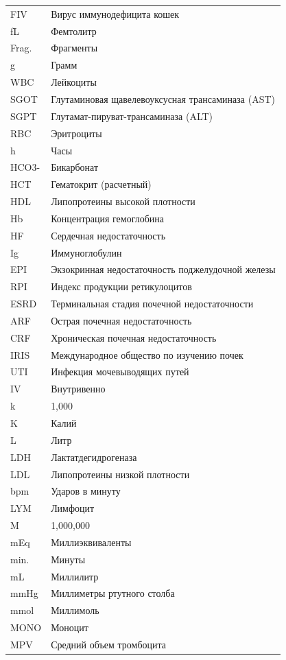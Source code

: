 \documentclass[a4paper,12pt]{book}
\begin{document}
\begin{longtable}{p{4cm} p{10cm}}
FIV & Вирус иммунодефицита кошек \\
fL & Фемтолитр \\
Frag. & Фрагменты \\
g & Грамм \\
WBC & Лейкоциты \\
SGOT & Глутаминовая щавелевоуксусная трансаминаза (AST) \\
SGPT & Глутамат-пируват-трансаминаза (ALT) \\
RBC & Эритроциты \\
h & Часы \\
HCO3- & Бикарбонат \\
HCT & Гематокрит (расчетный) \\
HDL & Липопротеины высокой плотности \\
Hb & Концентрация гемоглобина \\
HF & Сердечная недостаточность \\
Ig & Иммуноглобулин \\
EPI & Экзокринная недостаточность поджелудочной железы \\
RPI & Индекс продукции ретикулоцитов \\
ESRD & Терминальная стадия почечной недостаточности \\
ARF & Острая почечная недостаточность \\
CRF & Хроническая почечная недостаточность \\
IRIS & Международное общество по изучению почек \\
UTI & Инфекция мочевыводящих путей \\
IV & Внутривенно \\
k & 1,000 \\
K & Калий \\
L & Литр \\
LDH & Лактатдегидрогеназа \\
LDL & Липопротеины низкой плотности \\
bpm & Ударов в минуту \\
LYM & Лимфоцит \\
M & 1,000,000 \\
mEq & Миллиэквиваленты \\
min. & Минуты \\
mL & Миллилитр \\
mmHg & Миллиметры ртутного столба \\
mmol & Миллимоль \\
MONO & Моноцит \\
MPV & Средний объем тромбоцита \\

\end{longtable}
\end{document}

